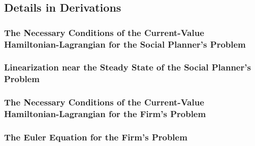\subsection{Details in Derivations}

\subsubsection{The Necessary Conditions of the Current-Value Hamiltonian-Lagrangian for the Social Planner's Problem}
\label{C3-Appendix_Derivations_Social-Planners-Problem_Necessary-Conditions}

\subsubsection{Linearization near the Steady State of the Social Planner's Problem}
\label{C3-Appendix_Derivations_Linearization-near-the-Steady-State-of-the-Social-Planners-Problem}


\subsubsection{The Necessary Conditions of the Current-Value Hamiltonian-Lagrangian for the Firm's Problem}
\label{C3-Appendix_Derivations_Firms-Problem_Necessary-Conditions}

\subsubsection{The Euler Equation for the Firm's Problem}
\label{C3-Appendix_Derivations_Euler-Equation-for-the-Firms-Problem}

